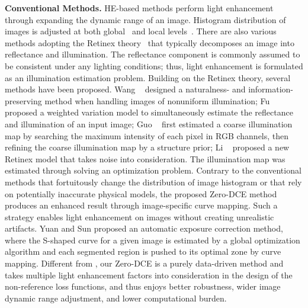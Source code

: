 \documentclass[10pt,twocolumn,letterpaper]{article}
\begin{document}
\noindent
\textbf{Conventional Methods.}
HE-based methods perform light enhancement through expanding the dynamic range of an image. Histogram distribution of images is adjusted at both global~\cite{Coltuc2006,Ibrahim2007} and local levels~\cite{Stark2000,Lee2013}. There are also various methods adopting the Retinex theory~\cite{Land1977} that typically decomposes an image into reflectance and illumination. The reflectance component is commonly assumed to be consistent under any lighting conditions; thus, light enhancement is formulated as an illumination estimation problem. Building on the Retinex theory, several methods have been proposed. Wang \etal~\cite{Wang2013} designed a naturalness- and information-preserving method when handling images of nonuniform illumination; Fu \etal~\cite{Fu2016} proposed a weighted variation model to simultaneously estimate the reflectance and illumination of an input image; Guo \etal~\cite{Guo2017} first estimated a coarse illumination map by searching the maximum intensity of each pixel in RGB channels, then refining the coarse illumination map by a structure prior; Li \etal~\cite{Li2018} proposed a new Retinex model that takes noise into consideration. The illumination map was estimated through solving an optimization problem.
Contrary to the conventional methods that fortuitously change the distribution of image histogram or that rely on potentially inaccurate physical models, the proposed Zero-DCE method produces an enhanced result through image-specific curve mapping. Such a strategy enables light enhancement on images without creating unrealistic artifacts.
Yuan and Sun \cite{Yuan2012} proposed an automatic exposure correction method, where the S-shaped curve for a given image is estimated by a global optimization algorithm and each segmented region is pushed to its optimal zone by curve mapping. Different from \cite{Yuan2012}, our Zero-DCE is a purely data-driven method and takes multiple light enhancement factors into consideration in the design of the non-reference loss functions, and thus enjoys better robustness, wider image dynamic range adjustment, and lower computational burden.
\end{document}
